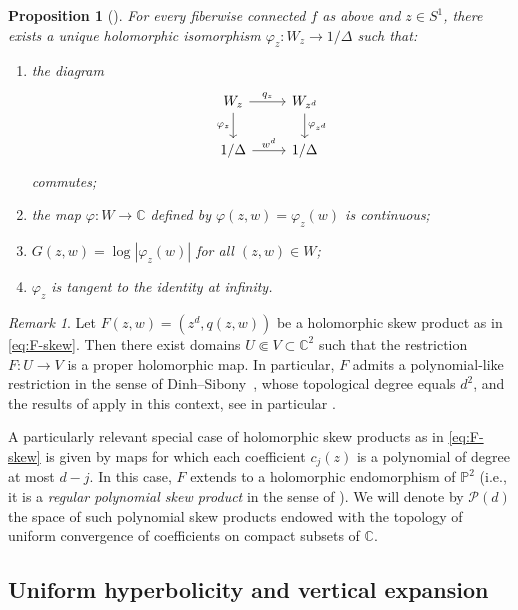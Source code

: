 \documentclass[11pt]{amsart}
\theoremstyle{plain}
\newtheorem{prop}[thm]{Proposition}
\theoremstyle{definition}
\theoremstyle{remark}
\newtheorem{rmk}[thm]{Remark}
\begin{document}
\begin{prop}[{\cite[Proposition~2.7]{Sester99}}]\label{prop_sester}
For every 
fiberwise connected
 $f$ as above
and $z\in S^1$, there exists a unique holomorphic isomorphism
$\varphi_z \colon W_z \longrightarrow 1/\Delta$
such that:
\begin{enumerate}
\item the diagram
\[
\begin{tikzcd}
W_z \arrow{r}{q_z} \arrow[swap]{d}{\varphi_z} &
W_{z^d} \arrow{d}{\varphi_{z^d}} \\
1/\Delta \arrow{r}{w^d} &
1/\Delta
\end{tikzcd}
\]
commutes;
\item the map $\varphi\colon W\to\mathbb C$ defined by $\varphi(z,w)=\varphi_z(w)$ is continuous;
\item $G(z,w)=\log|\varphi_z(w)|$ for all $(z,w)\in W$;
\item $\varphi_z$ is tangent to the identity at infinity.
\end{enumerate}
\end{prop}


\begin{rmk}
Let $F(z,w)=(z^d,q(z,w))$ be a holomorphic skew product as in
\eqref{eq:F-skew}.
Then there exist domains $U\Subset V\subset\mathbb C^2$ such that the restriction
$F\colon U\to V$ is a proper holomorphic map.
In particular, $F$ admits a polynomial-like restriction
in the sense of Dinh--Sibony~\cite{DS03}, whose
topological
 degree equals $d^2$,
and the results of \cite{BHMane} apply in this context, see
in particular \cite[Remark 1.4]{BHMane}.

A particularly relevant special case
of holomorphic skew products as in \eqref{eq:F-skew} 
is given by maps for which
each coefficient $c_j(z)$ is a polynomial of degree at most $d-j$.
In this case, $F$ extends to a holomorphic endomorphism of $\mathbb P^2$
(i.e., it is a \emph{regular polynomial skew product} in the sense of \cite{BedfordJonsson, Jonsson99}).
We will denote by $\mathcal P(d)$ 
the space of such polynomial skew products
 endowed with the topology of uniform convergence of coefficients on compact
subsets of $\mathbb C$.
\end{rmk}



\subsection{Uniform hyperbolicity and vertical expansion}\label{sec_expansion}
\end{document}

